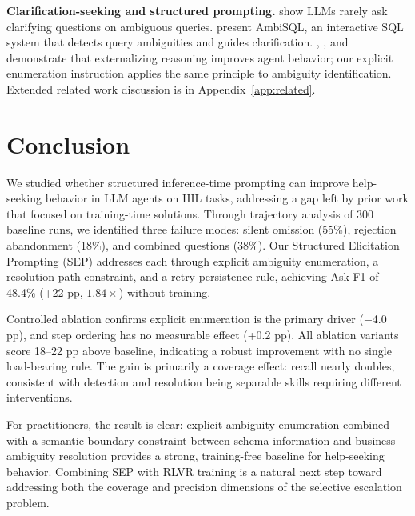 \documentclass{article} %
\newcommand{\oursystem}{SEP} %
\begin{document}
\textbf{Clarification-seeking and structured prompting.}
\citet{selective_clarification2022} show LLMs rarely ask clarifying questions on
ambiguous queries.
\citet{ambisql2025} present AmbiSQL, an interactive SQL system that detects query
ambiguities and guides clarification.
\citet{wei2022chain}, \citet{yao2023react}, and \citet{shinn2023reflexion} demonstrate
that externalizing reasoning improves agent behavior; our explicit enumeration instruction
applies the same principle to ambiguity identification.
Extended related work discussion is in Appendix~\ref{app:related}.

\section{Conclusion}
\label{sec:conclusion}

We studied whether structured inference-time prompting can improve help-seeking behavior
in LLM agents on HIL tasks, addressing a gap left by prior work that focused on
training-time solutions.
Through trajectory analysis of 300 baseline runs, we identified three failure modes:
silent omission (55\%), rejection abandonment (18\%), and combined questions (38\%).
Our Structured Elicitation Prompting (\oursystem{}) addresses each through explicit
ambiguity enumeration, a resolution path constraint, and a retry persistence rule,
achieving Ask-F1 of 48.4\% (+22 pp, $1.84\times$) without training.

Controlled ablation confirms explicit enumeration is the primary driver ($-$4.0 pp),
and step ordering has no measurable effect (+0.2 pp).
All ablation variants score 18--22 pp above baseline, indicating a robust improvement
with no single load-bearing rule.
The gain is primarily a coverage effect: recall nearly doubles, consistent with
detection and resolution being separable skills requiring different interventions.

For practitioners, the result is clear: explicit ambiguity enumeration combined with
a semantic boundary constraint between schema information and business ambiguity
resolution provides a strong, training-free baseline for help-seeking behavior.
Combining \oursystem{} with RLVR training is a natural next step toward addressing
both the coverage and precision dimensions of the selective escalation problem.

\end{document}

